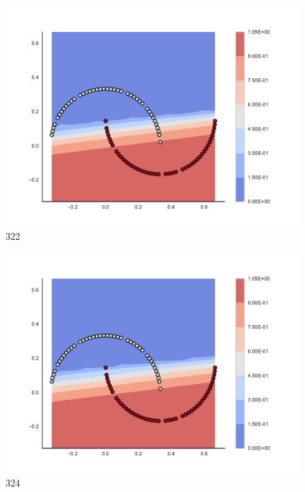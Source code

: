 \begin{subfigure}[b]{0.09\textwidth}
    \includegraphics[clip, trim=2.35cm 1.75cm 4.5cm 0cm,width=\textwidth]{img/convergence/322.pdf}
    \caption{322}
    \label{fig:convergence_322}
\end{subfigure}
%
\begin{subfigure}[b]{0.09\textwidth}
    \includegraphics[clip, trim=2.35cm 1.75cm 4.5cm 0cm,width=\textwidth]{img/convergence/324.pdf}
    \caption{324}
    \label{fig:convergence_324}
\end{subfigure}
%
